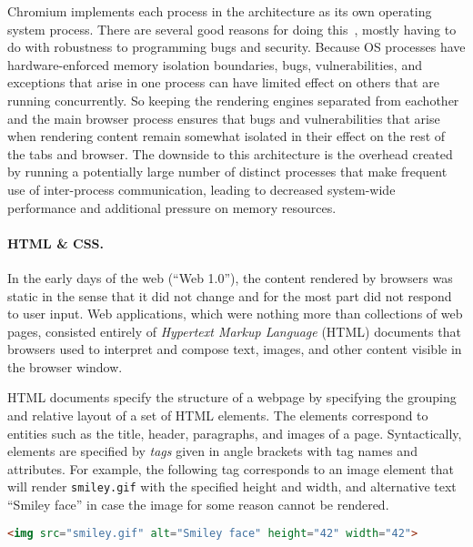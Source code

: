 \documentclass[11pt,twoside]{scrartcl}
\begin{document}
Chromium implements each process in the architecture as its own operating system process. There are several good reasons for doing this~\cite{Barthe08}, mostly having to do with robustness to programming bugs and security. Because OS processes have hardware-enforced memory isolation boundaries, bugs, vulnerabilities, and exceptions that arise in one process can have limited effect on others that are running concurrently. So keeping the rendering engines separated from eachother and the main browser process ensures that bugs and vulnerabilities that arise when rendering content remain somewhat isolated in their effect on the rest of the tabs and browser. The downside to this architecture is the overhead created by running a potentially large number of distinct processes that make frequent use of inter-process communication, leading to decreased system-wide performance and additional pressure on memory resources.

\paragraph{HTML \& CSS.} In the early days of the web (``Web 1.0''), the content rendered by browsers was static in the sense that it did not change and for the most part did not respond to user input. Web applications, which were nothing more than collections of web pages, consisted entirely of \emph{Hypertext Markup Language} (HTML) documents that browsers used to interpret and compose text, images, and other content visible in the browser window. 

HTML documents specify the structure of a webpage by specifying the grouping and relative layout of a set of HTML elements. The elements correspond to entities such as the title, header, paragraphs, and images of a page. Syntactically, elements are specified by \emph{tags} given in angle brackets with tag names and attributes. For example, the following tag corresponds to an image element that will render \verb'smiley.gif' with the specified height and width, and alternative text ``Smiley face'' in case the image for some reason cannot be rendered.
\begin{lstlisting}[language=HTML]
<img src="smiley.gif" alt="Smiley face" height="42" width="42">
\end{lstlisting}
\end{document}
